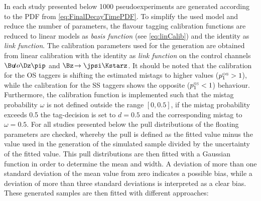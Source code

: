 In each study presented below \num{1000} pseudoexperiments are generated according to the PDF from \cref{eq:FinalDecayTimePDF}.
To simplify the used model and reduce the number of parameters, the flavour tagging calibration functions are reduced to linear models as \emph{basis function} (see \cref{eq:linCalib}) and the identity as \emph{link function}.
The calibration parameters used for the generation are obtained from linear calibration with the identity as \emph{link function} on the control channels $\Bu\!to\Dz\pip$ and $\Bz\!\to\jpsi\Kstarz$.
It should be noted that the calibration for the OS taggers is shifting the estimated mistags to higher values (\ie $p_1^{\text{\tiny OS}}>1$), while the calibration for the SS taggers shows the opposite (\ie $p_1^{\text{\tiny SS}}<1$) behaviour.
Furthermore, the calibration function is implemented such that the mistag probability $\omega$ is not defined outside the range $[0, 0.5]$, \ie if the mistag probability exceeds \num{0.5} the tag-decision is set to $d=0.5$ and the corresponding mistag to $\omega=0.5$.
For all studies presented below the pull distributions of the floating parameters are checked, whereby the pull is defined as the fitted value minus the value used in the generation of the simulated sample divided by the uncertainty of the fitted value.
This pull distributions are then fitted with a Gaussian function in order to determine the mean and width.
A deviation of more than one standard deviation of the mean value from zero indicates a possible bias, while a deviation of more than three standard deviations is interpreted as a clear bias.
These generated samples are then fitted with different approaches:
